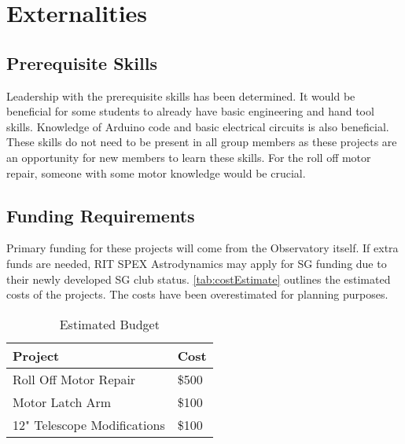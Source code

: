 \documentclass[conference]{IEEEtran} %
\begin{document}
\section{Externalities}
\subsection{Prerequisite Skills}
  Leadership with the prerequisite skills has been determined.
  It would be beneficial for some students to already have basic engineering and hand tool skills.
  Knowledge of Arduino code and basic electrical circuits is also beneficial.
  These skills do not need to be present in all group members as these projects are an opportunity for new members to learn these skills.
  For the roll off motor repair, someone with some motor knowledge would be crucial.

\subsection{Funding Requirements}
  Primary funding for these projects will come from the Observatory itself.
  If extra funds are needed, RIT SPEX Astrodynamics may apply for SG funding due to their newly developed SG club status.
  \autoref{tab:costEstimate} outlines the estimated costs of the projects.
  The costs have been overestimated for planning purposes.

  \begin{table}[hb!]
        \caption{Estimated Budget}
        \centering
        \begin{tabular}{ll}
          \toprule %
          Project & Cost \\
          \midrule %
          Roll Off Motor Repair & \$500 \\
          Motor Latch Arm & \$100 \\
          12" Telescope Modifications & \$100 \\
          \bottomrule
        \end{tabular}
    \label{tab:costEstimate}
    \end{table}
\end{document}
